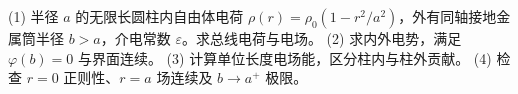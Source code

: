 (1) 半径 \(a\) 的无限长圆柱内自由体电荷 \(\rho(r)=\rho_0(1-r^2/a^2)\)，外有同轴接地金属筒半径 \(b>a\)，介电常数 \(\varepsilon\)。求总线电荷与电场。
(2) 求内外电势，满足 \(\varphi(b)=0\) 与界面连续。
(3) 计算单位长度电场能，区分柱内与柱外贡献。
(4) 检查 \(r=0\) 正则性、\(r=a\) 场连续及 \(b\to a^+\) 极限。
